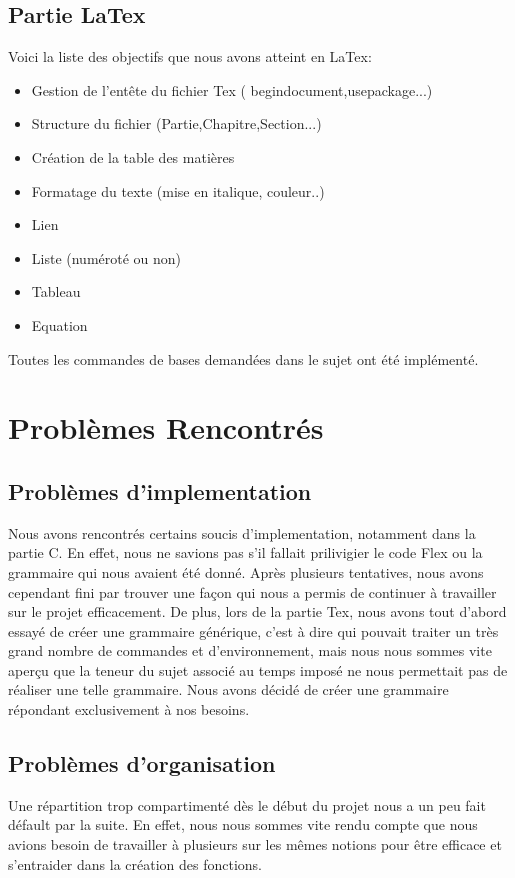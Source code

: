\documentclass{report}
\begin{document}
\section{Partie LaTex}
Voici la liste des objectifs que nous avons atteint en LaTex:
\begin{itemize}
\item Gestion de l'entête du fichier Tex ( begindocument,usepackage...)
\item Structure du fichier (Partie,Chapitre,Section...)
\item Création de la table des matières
\item Formatage du texte (mise en italique, couleur..)
\item Lien
\item Liste (numéroté ou non)
\item Tableau
\item Equation
\end{itemize}
Toutes les commandes de bases demandées dans le sujet ont été implémenté.
\chapter{Problèmes Rencontrés}
\section{Problèmes d'implementation}
Nous avons rencontrés certains soucis d'implementation, notamment dans la partie C. En effet, nous ne savions pas s'il fallait prilivigier le code Flex ou la grammaire qui nous avaient été donné. Après plusieurs tentatives, nous avons cependant fini par trouver une façon qui nous a permis de continuer à travailler sur le projet efficacement.
De plus, lors de la partie Tex, nous avons tout d'abord essayé de créer une grammaire  générique, c'est à dire qui pouvait traiter un très grand nombre de commandes et d'environnement, mais nous nous sommes vite aperçu que la teneur du sujet associé au temps imposé ne nous permettait pas de réaliser une telle grammaire.
Nous avons décidé de créer une grammaire répondant exclusivement à nos besoins.
\section{Problèmes d'organisation}
Une répartition trop compartimenté dès le début du projet nous a un peu fait défault par la suite. En effet, nous nous sommes vite rendu compte que nous avions besoin de travailler à plusieurs sur les mêmes notions pour être efficace et s'entraider dans la création des fonctions.
\end{document}
